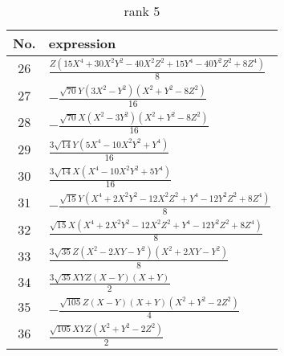 \documentclass[fleqn,8pt,landscape]{jsarticle}
\begin{document}
\begin{table}[ht!]
\begin{center}
\caption{rank 5}
\renewcommand{\arraystretch}{1.3}
\begin{tabular}{cl} \hline \hline
No. & expression \\ \hline
$ 26 $ & $ \frac{Z \left(15 X^{4} + 30 X^{2} Y^{2} - 40 X^{2} Z^{2} + 15 Y^{4} - 40 Y^{2} Z^{2} + 8 Z^{4}\right)}{8} $ \\
$ 27 $ & $ - \frac{\sqrt{70} Y \left(3 X^{2} - Y^{2}\right) \left(X^{2} + Y^{2} - 8 Z^{2}\right)}{16} $ \\
$ 28 $ & $ - \frac{\sqrt{70} X \left(X^{2} - 3 Y^{2}\right) \left(X^{2} + Y^{2} - 8 Z^{2}\right)}{16} $ \\
$ 29 $ & $ \frac{3 \sqrt{14} Y \left(5 X^{4} - 10 X^{2} Y^{2} + Y^{4}\right)}{16} $ \\
$ 30 $ & $ \frac{3 \sqrt{14} X \left(X^{4} - 10 X^{2} Y^{2} + 5 Y^{4}\right)}{16} $ \\
$ 31 $ & $ - \frac{\sqrt{15} Y \left(X^{4} + 2 X^{2} Y^{2} - 12 X^{2} Z^{2} + Y^{4} - 12 Y^{2} Z^{2} + 8 Z^{4}\right)}{8} $ \\
$ 32 $ & $ \frac{\sqrt{15} X \left(X^{4} + 2 X^{2} Y^{2} - 12 X^{2} Z^{2} + Y^{4} - 12 Y^{2} Z^{2} + 8 Z^{4}\right)}{8} $ \\
$ 33 $ & $ \frac{3 \sqrt{35} Z \left(X^{2} - 2 X Y - Y^{2}\right) \left(X^{2} + 2 X Y - Y^{2}\right)}{8} $ \\
$ 34 $ & $ \frac{3 \sqrt{35} X Y Z \left(X - Y\right) \left(X + Y\right)}{2} $ \\
$ 35 $ & $ - \frac{\sqrt{105} Z \left(X - Y\right) \left(X + Y\right) \left(X^{2} + Y^{2} - 2 Z^{2}\right)}{4} $ \\
$ 36 $ & $ \frac{\sqrt{105} X Y Z \left(X^{2} + Y^{2} - 2 Z^{2}\right)}{2} $ \\
 \hline \hline
\end{tabular}
\end{center}
\end{table}
\end{document}
